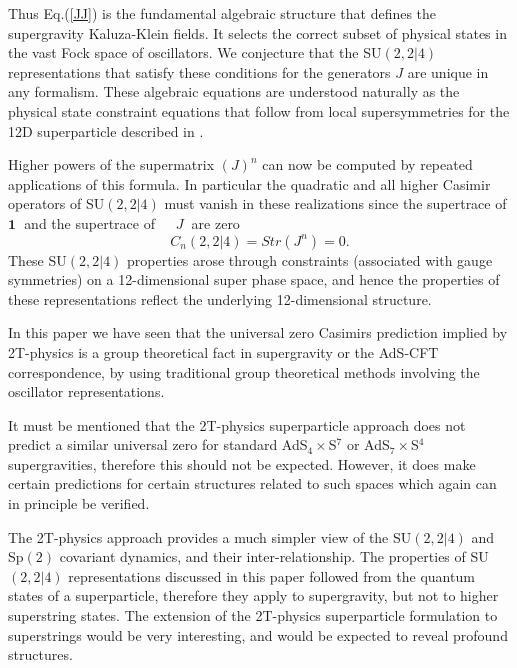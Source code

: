 \documentclass[a4paper,aps,preprint,nofootinbib]{revtex4}
\begin{document}
Thus Eq.(\ref{JJ}) is the fundamental algebraic structure that
defines the supergravity Kaluza-Klein fields. It selects the
correct subset of physical states in the vast Fock space of
oscillators. We conjecture that the SU$\left( 2,2|4\right)$
representations that satisfy these conditions for the generators
$J$ are unique in any formalism. These algebraic equations are
understood naturally as the physical state constraint equations
that follow from local supersymmetries for the 12D superparticle
described in \cite{AdS5S5}.

Higher powers of the supermatrix $\left( J\right) ^{n}$ can now be
computed by repeated applications of this formula. In particular
the quadratic and all higher Casimir operators of SU$\left(
2,2|4\right) $ must vanish in these realizations
since the supertrace of $\mathbf{1}$\textbf{\ }and the supertrace of\textbf{%
\ \ }$J$\textbf{\ }are zero
\begin{equation}
C_{n}\left( 2,2|4\right) =Str\left( J^{n}\right) =0.  \label{Cn}
\end{equation}%
These SU$\left( 2,2|4\right) $ properties arose through constraints
(associated with gauge symmetries) on a 12-dimensional super phase space,
and hence the properties of these representations reflect the underlying
12-dimensional structure.

In this paper we have seen that the universal zero Casimirs
prediction implied by 2T-physics \cite{AdS5S5} is a group
theoretical fact in supergravity or the AdS-CFT correspondence, by
using traditional group theoretical methods involving the
oscillator representations.

It must be mentioned that the 2T-physics superparticle approach
does not predict a similar universal zero for standard
AdS$_4\times$S$^7$ or AdS$_7\times$S$^4$ supergravities, therefore
this should not be expected. However, it does make certain
predictions \cite{AdS5S5} for certain structures related to such
spaces which again can in principle be verified.

The 2T-physics approach provides a much simpler view of the SU$\left(
2,2|4\right) $ and Sp$\left( 2\right) $ covariant dynamics, and their
inter-relationship. The properties of SU$\left( 2,2|4\right) $
representations discussed in this paper followed from the quantum states of
a superparticle, therefore they apply to supergravity, but not to higher
superstring states. The extension of the 2T-physics superparticle
formulation to superstrings would be very interesting, and would be expected
to reveal profound structures.
\end{document}
